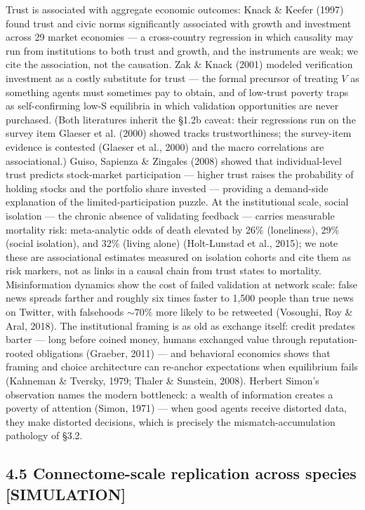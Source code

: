 \documentclass[11pt,twocolumn]{article}
\theoremstyle{gttdef}
\theoremstyle{gttplain}
\begin{document}
Trust is associated with aggregate economic outcomes: Knack \& Keefer (1997) found trust and civic norms significantly associated with growth and investment across 29 market economies --- a cross-country regression in which causality may run from institutions to both trust and growth, and the instruments are weak; we cite the association, not the causation. Zak \& Knack (2001) modeled verification investment as a costly substitute for trust --- the formal precursor of treating $V$ as something agents must sometimes pay to obtain, and of low-trust poverty traps as self-confirming low-S equilibria in which validation opportunities are never purchased. (Both literatures inherit the \S{}1.2b caveat: their regressions run on the survey item Glaeser et al. (2000) showed tracks trustworthiness; the survey-item evidence is contested (Glaeser et al., 2000) and the macro correlations are associational.) Guiso, Sapienza \& Zingales (2008) showed that individual-level trust predicts stock-market participation --- higher trust raises the probability of holding stocks and the portfolio share invested --- providing a demand-side explanation of the limited-participation puzzle. At the institutional scale, social isolation --- the chronic absence of validating feedback --- carries measurable mortality risk: meta-analytic odds of death elevated by 26\% (loneliness), 29\% (social isolation), and 32\% (living alone) (Holt-Lunstad et al., 2015); we note these are associational estimates measured on isolation cohorts and cite them as risk markers, not as links in a causal chain from trust states to mortality. Misinformation dynamics show the cost of failed validation at network scale: false news spreads farther and roughly six times faster to 1,500 people than true news on Twitter, with falsehoods $\sim70\%$ more likely to be retweeted (Vosoughi, Roy \& Aral, 2018). The institutional framing is as old as exchange itself: credit predates barter --- long before coined money, humans exchanged value through reputation-rooted obligations (Graeber, 2011) --- and behavioral economics shows that framing and choice architecture can re-anchor expectations when equilibrium fails (Kahneman \& Tversky, 1979; Thaler \& Sunstein, 2008). Herbert Simon's observation names the modern bottleneck: a wealth of information creates a poverty of attention (Simon, 1971) --- when good agents receive distorted data, they make distorted decisions, which is precisely the mismatch-accumulation pathology of \S{}3.2.

\subsection*{4.5 Connectome-scale replication across species [SIMULATION]}
\end{document}
